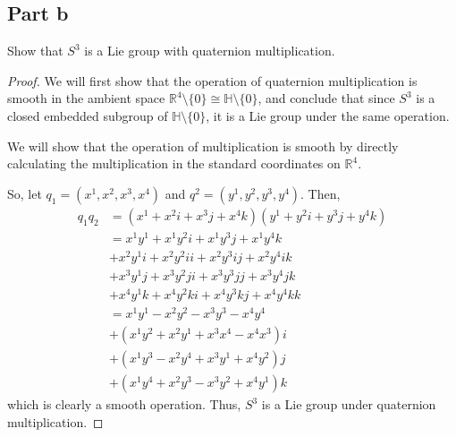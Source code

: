 \documentclass[fontsize=11pt]{scrartcl} %
\numberwithin{equation}{section} %
\numberwithin{figure}{section} %
\numberwithin{table}{section} %
\newcommand{\R}{\mathbb{R}}
\begin{document}
\subsection*{Part b}
Show that $S^3$ is a Lie group with quaternion multiplication.
\\
\begin{proof}
We will first show that the operation of quaternion multiplication is smooth
    in the ambient space $\R^4\setminus\{0\}\cong\mathbb{H}\setminus\{0\}$, and
    conclude that since $S^3$ is a closed embedded subgroup of
    $\mathbb{H}\setminus\{0\}$, it is a Lie group under the same operation.

    We will show that the operation of multiplication is smooth by directly
    calculating the multiplication in the standard coordinates on $\R^4$.

    So, let $q_1 = (x^1,x^2,x^3,x^4)$ and $q^2=(y^1,y^2,y^3,y^4)$. Then,
    \[
        \begin{aligned}
            q_1q_2 &= (x^1+x^2i+x^3j+x^4k)(y^1+y^2i+y^3j+y^4k)\\
                    &=x^1y^1 + x^1y^2i + x^1y^3j + x^1y^4k\\
                    &+x^2y^1i + x^2y^2ii + x^2y^3ij + x^2y^4ik\\
                    &+x^3y^1j + x^3y^2ji + x^3y^3jj + x^3y^4jk\\
                    &+x^4y^1k + x^4y^2ki + x^4y^3kj + x^4y^4kk\\
                    &= x^1y^1 - x^2y^2 - x^3y^3 - x^4y^4\\
                    &+(x^1y^2 + x^2y^1 + x^3x^4 - x^4x^3)i\\
                    &+(x^1y^3 - x^2y^4 + x^3y^1 + x^4y^2)j\\
                    &+(x^1y^4 + x^2y^3 - x^3y^2 + x^4y^1)k
        \end{aligned}
    \]
    which is clearly a smooth operation. Thus, $S^3$ is a Lie group under
    quaternion multiplication.
\end{proof}
\end{document}
